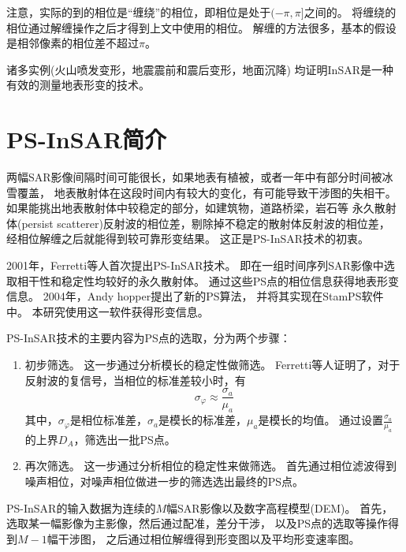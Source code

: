 注意，实际的到的相位是“缠绕”的相位，即相位是处于$(-\pi,\pi]$之间的。
将缠绕的相位通过解缠操作之后才得到上文中使用的相位。
解缠的方法很多，基本的假设是相邻像素的相位差不超过$\pi$。

诸多实例(火山喷发变形，地震震前和震后变形，地面沉降)
均证明InSAR是一种有效的测量地表形变的技术。

\section{PS-InSAR简介}
两幅SAR影像间隔时间可能很长，如果地表有植被，或者一年中有部分时间被冰雪覆盖，
地表散射体在这段时间内有较大的变化，有可能导致干涉图的失相干。
如果能挑出地表散射体中较稳定的部分，如建筑物，道路桥梁，岩石等
永久散射体(persist scatterer)反射波的相位差，剔除掉不稳定的散射体反射波的相位差，
经相位解缠之后就能得到较可靠形变结果。
这正是PS-InSAR技术的初衷。

2001年，Ferretti等人首次提出PS-InSAR\cite{ferrettiNonlinearSubsidenceRate2000}技术。
即在一组时间序列SAR影像中选取相干性和稳定性均较好的永久散射体。
通过这些PS点的相位信息获得地表形变信息。
2004年，Andy hopper提出了新的PS算法\cite{hooperNewMethodMeasuring2004}，
并将其实现在StamPS软件中\cite{hooperRecentAdvancesSAR2012}。
本研究使用这一软件获得形变信息。

PS-InSAR技术的主要内容为PS点的选取，分为两个步骤：
\begin{enumerate}
    \item 初步筛选。
    这一步通过分析模长的稳定性做筛选。
    Ferretti等人证明了，对于反射波的复信号，当相位的标准差较小时，有
    \begin{equation}
        \sigma_\varphi \approx \frac{\sigma_a}{\mu_a}
    \end{equation}
    其中，$\sigma_\varphi$是相位标准差，$\sigma_a$是模长的标准差，$\mu_a$是模长的均值。
    通过设置$\frac{\sigma_a}{\mu_a}$的上界$D_A$，筛选出一批PS点。
    \item 再次筛选。
    这一步通过分析相位的稳定性来做筛选。
    首先通过相位滤波得到噪声相位，对噪声相位做进一步的筛选选出最终的PS点。
\end{enumerate}

PS-InSAR的输入数据为连续的$M$幅SAR影像以及数字高程模型(DEM)。
首先，选取某一幅影像为主影像，然后通过配准，差分干涉，
以及PS点的选取等操作得到$M-1$幅干涉图，
之后通过相位解缠得到形变图以及平均形变速率图。

